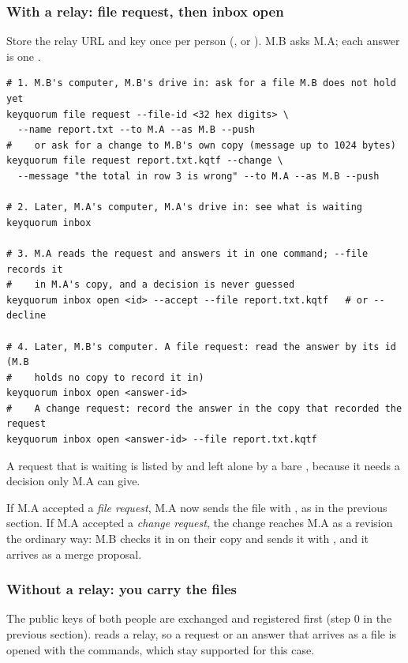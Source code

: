 \subsubsection*{With a relay: file request, then inbox open}

Store the relay URL and key once per person (, or ).
M.B asks M.A; each answer is one .

\begin{lstlisting}
# 1. M.B's computer, M.B's drive in: ask for a file M.B does not hold yet
keyquorum file request --file-id <32 hex digits> \
  --name report.txt --to M.A --as M.B --push
#    or ask for a change to M.B's own copy (message up to 1024 bytes)
keyquorum file request report.txt.kqtf --change \
  --message "the total in row 3 is wrong" --to M.A --as M.B --push

# 2. Later, M.A's computer, M.A's drive in: see what is waiting
keyquorum inbox

# 3. M.A reads the request and answers it in one command; --file records it
#    in M.A's copy, and a decision is never guessed
keyquorum inbox open <id> --accept --file report.txt.kqtf   # or --decline

# 4. Later, M.B's computer. A file request: read the answer by its id (M.B
#    holds no copy to record it in)
keyquorum inbox open <answer-id>
#    A change request: record the answer in the copy that recorded the request
keyquorum inbox open <answer-id> --file report.txt.kqtf
\end{lstlisting}

A request that is waiting is listed by  and left alone by a bare
, because it needs a decision only M.A can give.

If M.A accepted a \emph{file request}, M.A now sends the file with
, as in the previous section. If M.A accepted a \emph{change
request}, the change reaches M.A as a revision the ordinary way: M.B checks it
in on their copy and sends it with \code{send}, and it arrives as a merge
proposal.

\subsubsection*{Without a relay: you carry the files}

The public keys of both people are exchanged and registered first (step 0
in the previous section).  reads a relay, so a request or an answer
that arrives as a file is opened with the \code{file} commands, which stay
supported for this case.

